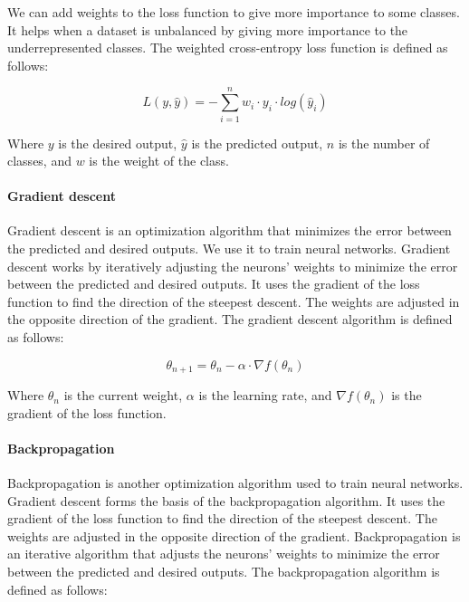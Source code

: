 We can add weights to the loss function to give more importance to some classes. It helps when a dataset is unbalanced by giving more importance to the underrepresented classes. The weighted cross-entropy loss function is defined as follows:

\begin{equation}
    L(y, \hat{y}) = - \sum_{i=1}^{n} w_{i} \cdot y_{i} \cdot log(\hat{y}_{i})
\end{equation}

Where $y$ is the desired output, $\hat{y}$ is the predicted output, $n$ is the number of classes, and $w$ is the weight of the class.

\paragraph{Gradient descent}

Gradient descent is an optimization algorithm that minimizes the error between the predicted and desired outputs. We use it to train neural networks. Gradient descent works by iteratively adjusting the neurons' weights to minimize the error between the predicted and desired outputs. It uses the gradient of the loss function to find the direction of the steepest descent. The weights are adjusted in the opposite direction of the gradient. The gradient descent algorithm is defined as follows:

\begin{equation}
    \theta_{n+1} = \theta_{n} - \alpha \cdot \nabla f(\theta_{n})
\end{equation}

Where $\theta_{n}$ is the current weight, $\alpha$ is the learning rate, and $\nabla f(\theta_{n})$ is the gradient of the loss function.

\paragraph{Backpropagation}

Backpropagation is another optimization algorithm used to train neural networks. Gradient descent forms the basis of the backpropagation algorithm. It uses the gradient of the loss function to find the direction of the steepest descent. The weights are adjusted in the opposite direction of the gradient. Backpropagation is an iterative algorithm that adjusts the neurons' weights to minimize the error between the predicted and desired outputs. The backpropagation algorithm is defined as follows:

